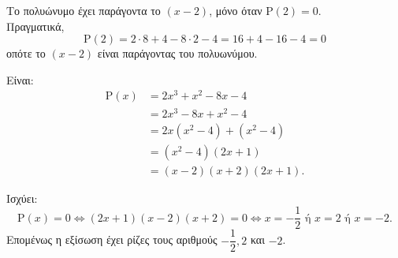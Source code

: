 \begin{alist}
\item Το πολυώνυμο έχει παράγοντα το $(x-2)$, μόνο όταν $\text{P}(2) = 0$. \\
Πραγματικά,
\[\text{P}(2) = 2\cdot 8 + 4 - 8\cdot 2 - 4 = 16 + 4 - 16 - 4 = 0\]
οπότε το $(x-2)$ είναι παράγοντας του πολυωνύμου.
\item Είναι:
\begin{align*}
\text{P}(x) &= 2x^3 + x^2 - 8x - 4 \\
&= 2x^3 - 8x + x^2 - 4 \\
&= 2x(x^2 - 4) + (x^2 - 4) \\
&= (x^2 - 4)(2x + 1) \\
&= (x-2)(x+2)(2x+1).
\end{align*}
\item Ισχύει:
\[\text{P}(x) = 0 \Leftrightarrow (2x+1)(x-2)(x+2) = 0 \Leftrightarrow x = -\frac{1}{2} \text{ ή } x = 2 \text{ ή } x = -2.\]
Επομένως η εξίσωση έχει ρίζες τους αριθμούς $-\dfrac{1}{2}, 2$ και $-2$.
\end{alist}

